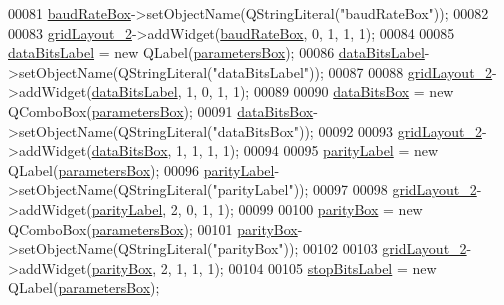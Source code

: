 \begin{DoxyCode}
00081         \hyperlink{a00029_a766a61db4a8c72219543f7c096ae5601}{baudRateBox}->setObjectName(QStringLiteral(\textcolor{stringliteral}{"baudRateBox"}));
00082 
00083         \hyperlink{a00029_a7b71d6038a34f600625f007630c5234e}{gridLayout\_2}->addWidget(\hyperlink{a00029_a766a61db4a8c72219543f7c096ae5601}{baudRateBox}, 0, 1, 1, 1);
00084 
00085         \hyperlink{a00029_a4d827d5f217aa166e228b0e2c9c5aaf7}{dataBitsLabel} = \textcolor{keyword}{new} QLabel(\hyperlink{a00029_a47cebbe70a990bd1f309250101022889}{parametersBox});
00086         \hyperlink{a00029_a4d827d5f217aa166e228b0e2c9c5aaf7}{dataBitsLabel}->setObjectName(QStringLiteral(\textcolor{stringliteral}{"dataBitsLabel"}));
00087 
00088         \hyperlink{a00029_a7b71d6038a34f600625f007630c5234e}{gridLayout\_2}->addWidget(\hyperlink{a00029_a4d827d5f217aa166e228b0e2c9c5aaf7}{dataBitsLabel}, 1, 0, 1, 1);
00089 
00090         \hyperlink{a00029_ab6082bb196e22af4ca04a04db3402166}{dataBitsBox} = \textcolor{keyword}{new} QComboBox(\hyperlink{a00029_a47cebbe70a990bd1f309250101022889}{parametersBox});
00091         \hyperlink{a00029_ab6082bb196e22af4ca04a04db3402166}{dataBitsBox}->setObjectName(QStringLiteral(\textcolor{stringliteral}{"dataBitsBox"}));
00092 
00093         \hyperlink{a00029_a7b71d6038a34f600625f007630c5234e}{gridLayout\_2}->addWidget(\hyperlink{a00029_ab6082bb196e22af4ca04a04db3402166}{dataBitsBox}, 1, 1, 1, 1);
00094 
00095         \hyperlink{a00029_ae062846ca8db471d7eb362ae39123422}{parityLabel} = \textcolor{keyword}{new} QLabel(\hyperlink{a00029_a47cebbe70a990bd1f309250101022889}{parametersBox});
00096         \hyperlink{a00029_ae062846ca8db471d7eb362ae39123422}{parityLabel}->setObjectName(QStringLiteral(\textcolor{stringliteral}{"parityLabel"}));
00097 
00098         \hyperlink{a00029_a7b71d6038a34f600625f007630c5234e}{gridLayout\_2}->addWidget(\hyperlink{a00029_ae062846ca8db471d7eb362ae39123422}{parityLabel}, 2, 0, 1, 1);
00099 
00100         \hyperlink{a00029_a88c0b5d1f96a308ab115937b090f7bba}{parityBox} = \textcolor{keyword}{new} QComboBox(\hyperlink{a00029_a47cebbe70a990bd1f309250101022889}{parametersBox});
00101         \hyperlink{a00029_a88c0b5d1f96a308ab115937b090f7bba}{parityBox}->setObjectName(QStringLiteral(\textcolor{stringliteral}{"parityBox"}));
00102 
00103         \hyperlink{a00029_a7b71d6038a34f600625f007630c5234e}{gridLayout\_2}->addWidget(\hyperlink{a00029_a88c0b5d1f96a308ab115937b090f7bba}{parityBox}, 2, 1, 1, 1);
00104 
00105         \hyperlink{a00029_a665748b39dda24475690e2363b72e265}{stopBitsLabel} = \textcolor{keyword}{new} QLabel(\hyperlink{a00029_a47cebbe70a990bd1f309250101022889}{parametersBox});

\end{DoxyCode}

